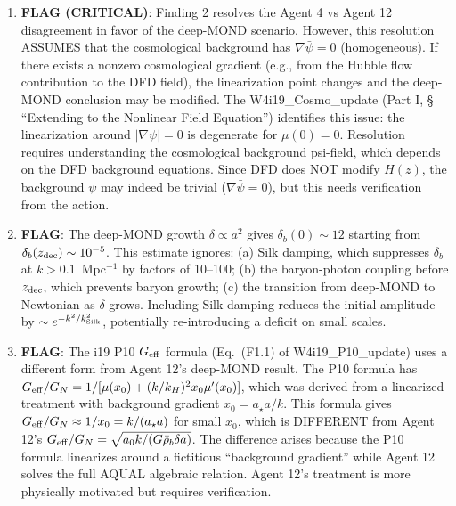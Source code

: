 \documentclass[11pt]{article}
\theoremstyle{definition}
\theoremstyle{remark}
\newcommand{\Geff}{G_{\rm eff}}
\newcommand{\astar}{a_\star}
\begin{document}
\begin{tcolorbox}[colback=red!5!white, colframe=red!60!black,
  title=\textbf{INCONSISTENCIES AND FLAGS}]
\begin{enumerate}[nosep]
\item \textbf{FLAG (CRITICAL)}: Finding 2 resolves the Agent 4 vs
  Agent 12 disagreement in favor of the deep-MOND scenario.
  However, this resolution ASSUMES that the cosmological background
  has $\nabla\bar\psi = 0$ (homogeneous). If there exists a nonzero
  cosmological gradient (e.g., from the Hubble flow contribution to
  the DFD field), the linearization point changes and the deep-MOND
  conclusion may be modified. The W4i19\_Cosmo\_update (Part I, \S
  ``Extending to the Nonlinear Field Equation'') identifies this
  issue: the linearization around $|\nabla\psi| = 0$ is degenerate
  for $\mu(0) = 0$. Resolution requires understanding the cosmological
  background psi-field, which depends on the DFD background equations.
  Since DFD does NOT modify $H(z)$, the background $\psi$ may indeed
  be trivial ($\nabla\bar\psi = 0$), but this needs verification from
  the action.

\item \textbf{FLAG}: The deep-MOND growth $\delta \propto a^2$
  gives $\delta_b(0) \sim 12$ starting from $\delta_b(z_{\rm dec})
  \sim 10^{-5}$. This estimate ignores: (a) Silk damping, which
  suppresses $\delta_b$ at $k > 0.1$~Mpc$^{-1}$ by factors of
  10--100; (b) the baryon-photon coupling before $z_{\rm dec}$, which
  prevents baryon growth; (c) the transition from deep-MOND to
  Newtonian as $\delta$ grows. Including Silk damping reduces the
  initial amplitude by $\sim e^{-k^2/k_{\rm Silk}^2}$, potentially
  re-introducing a deficit on small scales.

\item \textbf{FLAG}: The i19 P10 $\Geff$ formula (Eq.~(F1.1) of
  W4i19\_P10\_update) uses a different form from Agent 12's deep-MOND
  result. The P10 formula has $\Geff/G_N = 1/[\mu(x_0) + (k/k_H)^2
  x_0 \mu'(x_0)]$, which was derived from a linearized treatment
  with background gradient $x_0 = \astar a/k$. This formula gives
  $\Geff/G_N \approx 1/x_0 = k/(\astar a)$ for small $x_0$, which
  is DIFFERENT from Agent 12's $\Geff/G_N = \sqrt{a_0 k/(G\bar\rho_b
  \delta a)}$. The difference arises because the P10 formula linearizes
  around a fictitious ``background gradient'' while Agent 12 solves the
  full AQUAL algebraic relation. Agent 12's treatment is more
  physically motivated but requires verification.


\end{enumerate}
\end{tcolorbox}
\end{document}
